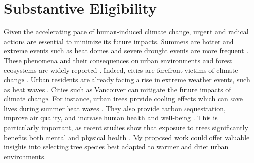 \documentclass[11pt,letter]{article}
\begin{document}
\section *{Substantive Eligibility} 
Given the accelerating pace of human-induced climate change, urgent and radical actions are essential to minimize its future impacts. Summers are hotter and extreme events such as heat domes and severe drought events are more frequent \citep{zhang_increased_2023}. These phenomena and their consequences on urban environments and forest ecosystems are widely reported \citep{allen_global_2010, mccarthy_climate_2010}. Indeed, cities are forefront victims of climate change \citep{das_unraveling_2024, corburn_cities_2009}. Urban residents are already facing a rise in extreme weather events, such as heat waves \citep{das_unraveling_2024}. Cities such as Vancouver can mitigate the future impacts of climate change. For instance, urban trees provide cooling effects which can save lives during summer heat waves \citep{ettinger_street_2024, zandler_cooling_2024}. They also provide carbon sequestration, improve air quality, and increase human health and well-being \citep{wolf_urban_2020}. This is particularly important, as recent studies show that exposure to trees significantly benefits both mental and physical health  \citep{wolf_urban_2020, turnerskoff_benefits_2019}. My proposed work could offer valuable insights into selecting tree species best adapted to warmer and drier urban environments.
\end{document}
